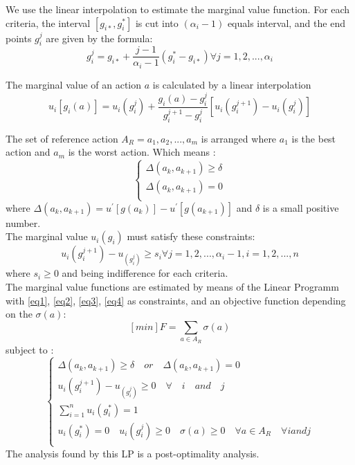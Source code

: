 \documentclass{report}
\begin{document}
We use the linear interpolation to estimate the marginal value function. For each criteria, the interval $[g_{i*}, g_i^{*}]$ is cut into $(\alpha _i -1)$ equals interval, and the end points $g_i^{j}$ are given by the formula:
\begin{equation}
	g_i^{j}= g_{i*} + \frac{j-1}{\alpha _i -1} (g_i^{*} - g_{i*})  \forall j = 1,2, ..., \alpha _i
\end{equation}

The marginal value of an action $a$ is calculated by a linear interpolation
\begin{equation}
	u_i [g_i (a)] = u_i (g_i^{j}) + \frac{g_i (a) - g_i^{j}}{ g_i^{j+1} - g_i^{j}} [u_i (g_i^{j+1}) - u_i (g_i^{j}) ] 
\end{equation}

The set of reference action $ A_R = a_1, a_2, ... , a_m$ is arranged where $a_1$ is the best action and $a_m$ is the worst action. Which means : 
\begin{equation}\label{eq3}
      \begin{cases}
      	\Delta (a_k, a_{k+1} ) \geq \delta\\
       	\Delta (a_k, a_{k+1} ) = 0 \\
      \end{cases}
\end{equation}
where $\Delta (a_k, a_{k+1} ) = u^{'} [g(a_k)] - u^{'} [g(a_{k+1})]$ and $\delta$ is a small positive number. \\

The marginal value $u_i (g_i)$ must satisfy these constraints: 
\begin{equation}\label{eq4}
	u_i (g_i^{j+1}) - u_(g_i^{j}) \geq s_i \forall j = 1,2, ..., \alpha _i  - 1, i = 1,2, ..., n 
\end{equation}
where $s_i \geq 0$ and being indifference for each criteria.  \\

The marginal value functions are estimated by means of the Linear Programm with \eqref{eq1}, \eqref{eq2}, \eqref{eq3}, \eqref{eq4} as constraints, and an objective function depending on the $\sigma(a)$: 
$$ [min]F = \sum_{a \in A_R} \sigma(a)  $$
subject to : \\
\begin{equation}
      \begin{cases}
      	\Delta (a_k, a_{k+1} ) \geq \delta \quad or \quad \Delta (a_k, a_{k+1} ) = 0 \\
       	u_i (g_i^{j+1}) - u_(g_i^{j}) \geq 0 \quad \forall \quad i \quad and \quad j\\
       	\sum_{i=1}^{n} u_i(g_{i}^{*}) = 1\\
	u_i (g_i^{*}) = 0 \quad  u_i(g_i^{j}) \geq 0 \quad  \sigma(a) \geq 0 \quad  \forall a \in A_R\quad  \forall i and j\\
      \end{cases}
\end{equation}
The analysis found by this LP is a post-optimality analysis. 
\newpage
\end{document}
